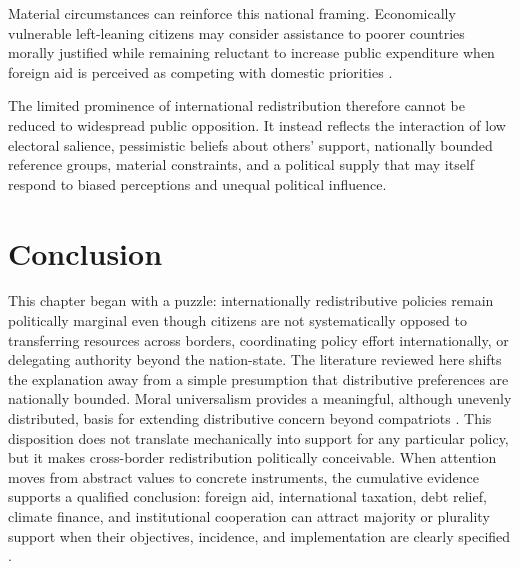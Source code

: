 \documentclass[11pt,a4paper]{article}
\begin{document}
Material circumstances can reinforce this national framing. Economically vulnerable left-leaning citizens may consider assistance to poorer countries morally justified while remaining reluctant to increase public expenditure when foreign aid is perceived as competing with domestic priorities \citep{cho_ideology_2024}. %

The limited prominence of international redistribution therefore cannot be reduced to widespread public opposition. %
It instead reflects the interaction of low electoral salience, pessimistic beliefs about others' support, nationally bounded reference groups, material constraints, and a political supply that may itself respond to biased perceptions and unequal political influence.

\section*{Conclusion}
This chapter began with a puzzle: %
internationally redistributive policies remain politically marginal even though citizens are not systematically opposed to transferring resources across borders, coordinating policy effort internationally, or delegating authority beyond the nation-state. The literature reviewed here shifts the explanation away from a simple presumption that distributive preferences are nationally bounded. Moral universalism provides a meaningful, although unevenly distributed, basis for extending distributive concern beyond compatriots \citep{enke_moral_2023}. This disposition does not translate mechanically into support for any particular policy, but it makes cross-border redistribution politically conceivable. When attention moves from abstract values to concrete instruments, the cumulative evidence supports a qualified conclusion: foreign aid, international taxation, debt relief, climate finance, and institutional cooperation can attract majority or plurality support when their objectives, incidence, and implementation are clearly specified \citep{fabre_majority_2025,fabre_public_2026}.
\end{document}
